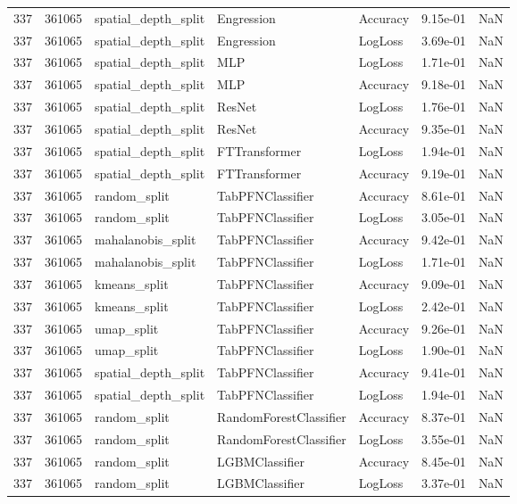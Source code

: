 \begin{tabular}{rrlllrr}
337 & 361065 & spatial\_depth\_split & Engression & Accuracy & 9.15e-01 & NaN \\
337 & 361065 & spatial\_depth\_split & Engression & LogLoss & 3.69e-01 & NaN \\
337 & 361065 & spatial\_depth\_split & MLP & LogLoss & 1.71e-01 & NaN \\
337 & 361065 & spatial\_depth\_split & MLP & Accuracy & 9.18e-01 & NaN \\
337 & 361065 & spatial\_depth\_split & ResNet & LogLoss & 1.76e-01 & NaN \\
337 & 361065 & spatial\_depth\_split & ResNet & Accuracy & 9.35e-01 & NaN \\
337 & 361065 & spatial\_depth\_split & FTTransformer & LogLoss & 1.94e-01 & NaN \\
337 & 361065 & spatial\_depth\_split & FTTransformer & Accuracy & 9.19e-01 & NaN \\
337 & 361065 & random\_split & TabPFNClassifier & Accuracy & 8.61e-01 & NaN \\
337 & 361065 & random\_split & TabPFNClassifier & LogLoss & 3.05e-01 & NaN \\
337 & 361065 & mahalanobis\_split & TabPFNClassifier & Accuracy & 9.42e-01 & NaN \\
337 & 361065 & mahalanobis\_split & TabPFNClassifier & LogLoss & 1.71e-01 & NaN \\
337 & 361065 & kmeans\_split & TabPFNClassifier & Accuracy & 9.09e-01 & NaN \\
337 & 361065 & kmeans\_split & TabPFNClassifier & LogLoss & 2.42e-01 & NaN \\
337 & 361065 & umap\_split & TabPFNClassifier & Accuracy & 9.26e-01 & NaN \\
337 & 361065 & umap\_split & TabPFNClassifier & LogLoss & 1.90e-01 & NaN \\
337 & 361065 & spatial\_depth\_split & TabPFNClassifier & Accuracy & 9.41e-01 & NaN \\
337 & 361065 & spatial\_depth\_split & TabPFNClassifier & LogLoss & 1.94e-01 & NaN \\
337 & 361065 & random\_split & RandomForestClassifier & Accuracy & 8.37e-01 & NaN \\
337 & 361065 & random\_split & RandomForestClassifier & LogLoss & 3.55e-01 & NaN \\
337 & 361065 & random\_split & LGBMClassifier & Accuracy & 8.45e-01 & NaN \\
337 & 361065 & random\_split & LGBMClassifier & LogLoss & 3.37e-01 & NaN \\

\end{tabular}
